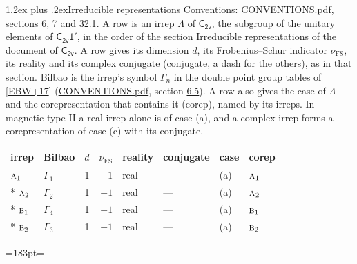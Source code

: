 \documentclass[10pt,a4paper]{article}
\makeatletter
\renewcommand\section{\@startsection{section}{1}{\z@}{-3ex plus -1ex minus -.2ex}%
  {1.2ex plus .2ex}{\normalfont\large\sffamily\bfseries\color{parttitle}}}
\newcommand{\needspace}[1]{\par\penalty-100\begingroup\dimen0=#1\relax\dimen2=\pagegoal
  \advance\dimen2-\pagetotal\ifdim\dimen0>\dimen2\relax\ifdim\dimen2>0pt\vfil\break\fi\fi
  \endgroup}
\numberwithin{equation}{section}
\newcommand{\grp}[1]{\mathsf{#1}}
\newcommand{\irr}[1]{\text{\normalfont\scshape #1}}
\newcommand{\fsind}{\nu_{\mathrm{FS}}}
\makeatother
\begin{document}
\section{Irreducible representations}\label{s:irreps}
Conventions: \href{../../CONVENTIONS.pdf}{CONVENTIONS.pdf}, sections \href{../../../rotation/CONVENTIONS.pdf\#conv.6}{6}, \href{../../../rotation/CONVENTIONS.pdf\#conv.7}{7} and \href{../../CONVENTIONS.pdf\#conv.32.1}{32.1}.
\leavevmode\label{n:irrep.Delta}A row is an irrep $\Lambda$ of $\grp{C_{2v}}$, the subgroup of the unitary elements of $\grp{C_{2v}1'}$, in the order of the section Irreducible representations of the document of \href{../../../rotation/data/pdf/C2v.pdf}{$\grp{C_{2v}}$}. \label{n:index.dimension}\label{n:index.frobenius}\label{n:head.irrep}\label{n:head.reality}\label{n:head.conjugate}A row gives its dimension $d$, its Frobenius--Schur indicator $\fsind$, its reality and its complex conjugate (conjugate, a dash for the others), as in that section. \label{n:head.bilbao}\label{n:irrep.alias.gamma}Bilbao is the irrep's symbol $\Gamma_n$ in the double point group tables of [\href{../../../REFERENCES.pdf\#ref.EBW+17}{EBW+17}] (\href{../../CONVENTIONS.pdf}{CONVENTIONS.pdf}, section \href{../../../rotation/CONVENTIONS.pdf\#conv.6.5}{6.5}). \label{n:head.case.corep}\label{n:head.corep}A row also gives the case of $\Lambda$ and the corepresentation that contains it (corep), named by its irreps. In magnetic type II a real irrep alone is of case (a), and a complex irrep forms a corepresentation of case (c) with its conjugate.
\setlength{\emergencystretch}{2em}\par\setlength{\emergencystretch}{0pt}
{\small\renewcommand{\arraystretch}{1.25}\setlength{\tabcolsep}{4pt}\begin{longtable}{@{}llrrllll@{}}\toprule
irrep & Bilbao & $d$ & $\fsind$ & reality & conjugate & case & corep\\\midrule\endhead
\bottomrule\endfoot\endlastfoot
$\irr{a}_{1}$ & $\Gamma_{1}$ & 1 & $+1$ & real & --- & (a) & $\irr{a}_{1}$\\*
$\irr{a}_{2}$ & $\Gamma_{2}$ & 1 & $+1$ & real & --- & (a) & $\irr{a}_{2}$\\*
$\irr{b}_{1}$ & $\Gamma_{4}$ & 1 & $+1$ & real & --- & (a) & $\irr{b}_{1}$\\*
$\irr{b}_{2}$ & $\Gamma_{3}$ & 1 & $+1$ & real & --- & (a) & $\irr{b}_{2}$\\
\bottomrule\end{longtable}}
\needspace{183pt}
\end{document}

